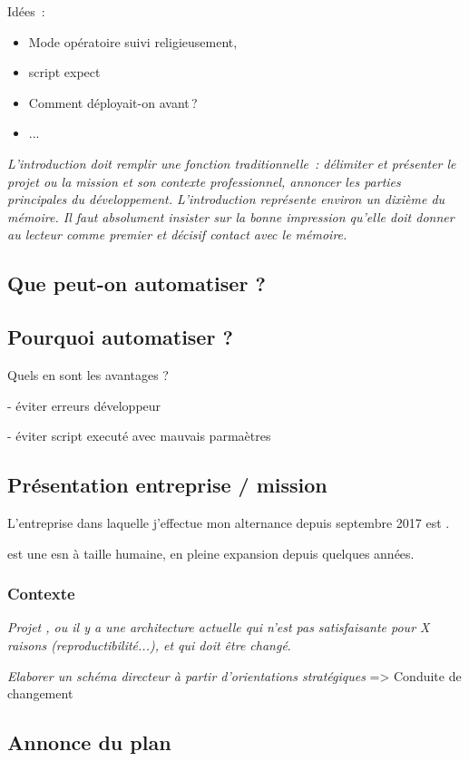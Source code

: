 Idées : 
	
\begin{itemize}
	\item Mode opératoire suivi religieusement, 
	\item script expect
	\item Comment déployait-on avant ?
	\item ...
\end{itemize}

\textit{L’introduction doit remplir une fonction traditionnelle : délimiter et présenter le projet ou la mission et son contexte professionnel, annoncer les parties principales du développement. L’introduction représente environ un dixième du mémoire. Il faut absolument insister sur la bonne impression qu’elle doit donner au lecteur comme premier et décisif contact avec le mémoire.}

\subsection{Que peut-on automatiser ?}

\subsection{Pourquoi automatiser ?}

Quels en sont les avantages ?

- éviter erreurs développeur

- éviter script executé avec mauvais parmaètres

\subsection{Présentation entreprise / mission}

L'entreprise dans laquelle j'effectue mon alternance depuis septembre 2017 est \onepoint. 

\onepoint{} est une \gls{esn} à taille humaine, en pleine expansion depuis quelques années.

\subsubsection{Contexte}

\textit{Projet \bv{}, ou il y a une architecture actuelle qui n'est pas satisfaisante pour X raisons (reproductibilité...), et qui doit être changé}.

\textit{Elaborer un schéma directeur à partir d’orientations stratégiques} => Conduite de changement


\subsection{Annonce du plan}